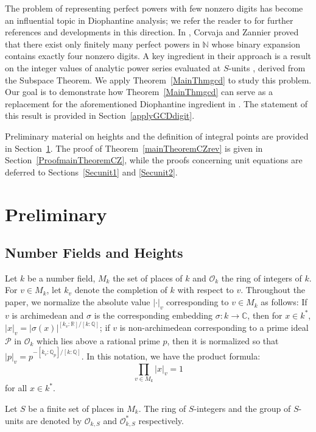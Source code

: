 \documentclass[10pt]{amsart}
\numberwithin{equation}{section}
\theoremstyle{plain}
\theoremstyle{definition}
\begin{document}
 The problem of representing perfect powers with few nonzero digits has become an influential topic in Diophantine analysis; we refer the reader to \cite{CZ2013} for further references and developments in this direction. In \cite{CZ2013}, Corvaja and Zannier proved that there exist only finitely many perfect powers in $\mathbb{N}$ whose binary expansion contains exactly four nonzero digits. A key ingredient in their approach is a result on the integer values of analytic power series evaluated at $S$-units \cite{CZ2005}, derived from the Subspace Theorem.  We apply Theorem~\ref{MainThmgcd} to study this problem. Our goal is to demonstrate how Theorem~\ref{MainThmgcd} can serve as a replacement for the aforementioned Diophantine ingredient in \cite{CZ2005}.
 The statement of this result is provided in Section~\ref{applyGCDdigit}.

Preliminary material on heights and the definition of integral points are provided in Section~\ref{Preliminary}. The proof of Theorem~\ref{mainTheoremCZrev} is given in Section~\ref{ProofmainTheoremCZ}, while the proofs concerning unit equations are deferred to Sections~\ref{Secunit1} and \ref{Secunit2}.


 \section{Preliminary}\label{Preliminary} 
 
\subsection{Number Fields and Heights}\label{Preliminary1} 
Let $k$ be a number field, $M_{k}$ the set of places of $k$ and $\mathcal{O}_{k}$ the ring of integers of $k$. For $v \in M_{k}$, let $k_{v}$ denote the completion of $k$ with respect to $v$. Throughout the paper, we normalize the absolute value $|\cdot |_{v}$ corresponding to $v\in M_{k}$ as follows: If $v$ is archimedean and $\sigma$ is the corresponding embedding $\sigma:k \to \mathbb{C}$, then for $x \in k^{*}$, $|x|_{v}=|\sigma(x)|^{[k_{v}:\mathbb{R}]/[k:\mathbb{Q}]}$; if $v$ is non-archimedean corresponding to a prime ideal $\mathscr{P}$ in $\mathcal{O}_{k}$ which lies above a rational prime $p$, then it is normalized so that $|p|_{v}=p^{-[k_{v}:\mathbb{Q}_{p}]/[k:\mathbb{Q}]}$. In this notation, we have the product formula:
$$\displaystyle \prod_{v \in M_{k}}|x|_{v}=1$$
for all $x \in k^{*}$.
 
Let $S$ be a finite set of places in $M_{k}$. The ring of $S$-integers and the group of $S$-units are denoted by $\mathcal{O}_{k,S}$ and $\mathcal{O}_{k,S}^{*}$ respectively.
\end{document}
